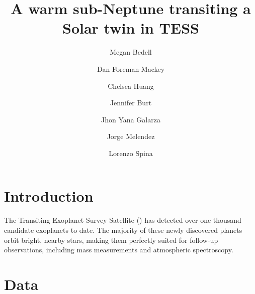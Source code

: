 \documentclass[modern]{aastex62}
\newcommand{\hoststar}{\acronym{HIP}\ 96160\xspace}
\begin{document}
\sloppy\sloppypar\raggedbottom\frenchspacing %

\graphicspath{ {figures/} }

\title{A warm sub-Neptune transiting a Solar twin in TESS}

\author[0000-0001-9907-7742]{Megan Bedell}
\affiliation{\flatiron}

\author{Dan Foreman-Mackey}
\affiliation{\flatiron}

\author{Chelsea Huang}
\affiliation{\MIT}

\author{Jennifer Burt}
\affiliation{\MIT}

\author{Jhon Yana Galarza}
\affiliation{\USP}

\author{Jorge Melendez}
\affiliation{\USP}

\author{Lorenzo Spina}



\author{}





\begin{abstract}\noindent
\end{abstract}

\keywords{
}

\section{Introduction}
\label{s:intro}

The Transiting Exoplanet Survey Satellite (\TESS) has detected over one thousand candidate exoplanets to date. 
The majority of these newly discovered planets orbit bright, nearby stars, making them perfectly suited for follow-up observations, including mass measurements and atmospheric spectroscopy. 



\section{Data}
\label{s:data}
\end{document}
